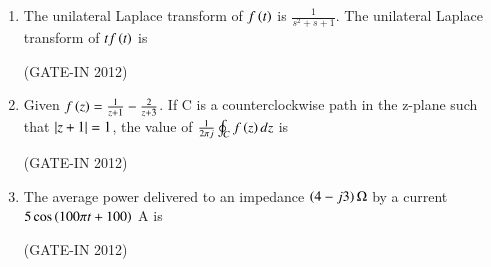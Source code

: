 \documentclass[journal,12pt,onecolumn]{IEEEtran}
\theoremstyle{remark}
\begin{document}
\begin{enumerate}
\item The unilateral Laplace transform of $f\left(t\right)$ is $\frac{1}{s^2+s+1}$. The unilateral Laplace transform of $t f\left(t\right)$ is

\hfill{(GATE-IN 2012)}
\begin{enumerate}
\end{enumerate}

\item Given
$f\left(z\right) = \frac{1}{z+1} - \frac{2}{z+3}$. If C is a counterclockwise path in the z-plane such that $\left\vert z+1\right\vert=1$, the value of $\frac{1}{2\pi j} \oint_C f\left(z\right)dz$ is

\hfill{(GATE-IN 2012)}
\begin{enumerate}
\end{enumerate}

\item The average power delivered to an impedance $\left(4 - j3\right) \ohm$ by a current $5\cos\left(100\pi t+100\right)$ A is

\hfill{(GATE-IN 2012)}
\begin{enumerate}
\end{enumerate}


\end{enumerate}
\end{document}
